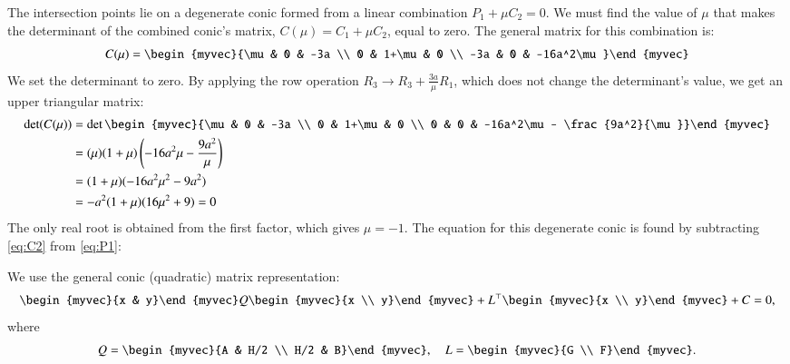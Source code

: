 \documentclass[journal]{IEEEtran}
\begin{document}
	The intersection points lie on a degenerate conic formed from a linear combination $P_1 + \mu C_2 = 0$. We must find the value of $\mu$ that makes the determinant of the combined conic's matrix, $C(\mu) = C_1 + \mu C_2$, equal to zero.
	The general matrix for this combination is:
	\begin{align}
		C(\mu) = \begin{myvec}{\mu & 0 & -3a \\ 0 & 1+\mu & 0 \\ -3a & 0 & -16a^2\mu}\end{myvec}
	\end{align}
	We set the determinant to zero. By applying the row operation $R_3 \to R_3 + \frac{3a}{\mu} R_1$, which does not change the determinant's value, we get an upper triangular matrix:
	\begin{align}
		\det(C(\mu)) &= \det \begin{myvec}{\mu & 0 & -3a \\ 0 & 1+\mu & 0 \\ 0 & 0 & -16a^2\mu - \frac{9a^2}{\mu}}\end{myvec} \nonumber \\
		&= (\mu)(1+\mu)\left(-16a^2\mu - \frac{9a^2}{\mu}\right) \nonumber \\
		&= (1+\mu)(-16a^2\mu^2 - 9a^2) \nonumber \\
		&= -a^2(1+\mu)(16\mu^2 + 9) = 0
	\end{align}
	The only real root is obtained from the first factor, which gives $\mu = -1$.
	The equation for this degenerate conic is found by subtracting \eqref{eq:C2} from \eqref{eq:P1}:
	
	We use the general conic (quadratic) matrix representation:
	\begin{align}
		\begin{myvec}{x & y}\end{myvec}
		Q
		\begin{myvec}{x \\ y}\end{myvec}
		+ 
		L^{\top}
		\begin{myvec}{x \\ y}\end{myvec}
		+ C = 0,
	\end{align}
	where 
	\begin{align}
		Q = 
		\begin{myvec}{A & H/2 \\ H/2 & B}\end{myvec}, 
		\quad 
		L = 
		\begin{myvec}{G \\ F}\end{myvec}.
	\end{align}
	
\end{document}
